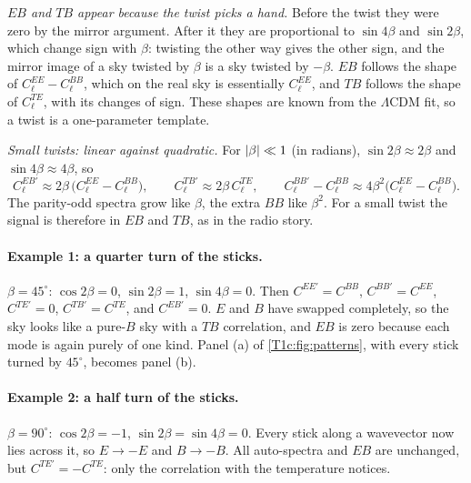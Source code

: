 \emph{$EB$ and $TB$ appear because the twist picks a hand.} Before the twist they were zero by the mirror argument. After it they are proportional to $\sin4\beta$ and $\sin2\beta$, which change sign with $\beta$: twisting the other way gives the other sign, and the mirror image of a sky twisted by $\beta$ is a sky twisted by $-\beta$. $EB$ follows the shape of $C^{EE}_\ell-C^{BB}_\ell$, which on the real sky is essentially $C^{EE}_\ell$, and $TB$ follows the shape of $C^{TE}_\ell$, with its changes of sign. These shapes are known from the $\Lambda$CDM fit, so a twist is a one-parameter template.

\emph{Small twists: linear against quadratic.} For $\left\lvert \beta\right\rvert\ll1$ (in radians), $\sin2\beta\approx2\beta$ and $\sin4\beta\approx4\beta$, so
\begin{equation}
C^{EB\prime}_\ell\approx2\beta\,\bigl(C^{EE}_\ell-C^{BB}_\ell\bigr),\qquad
C^{TB\prime}_\ell\approx2\beta\,C^{TE}_\ell,\qquad
C^{BB\prime}_\ell-C^{BB}_\ell\approx4\beta^2\bigl(C^{EE}_\ell-C^{BB}_\ell\bigr).
\label{T1c:eq:rot-small}
\end{equation}
The parity-odd spectra grow like $\beta$, the extra $BB$ like $\beta^2$. For a small twist the signal is therefore in $EB$ and $TB$, as in the radio story.

\paragraph{Example 1: a quarter turn of the sticks.} $\beta=45^\circ$: $\cos2\beta=0$, $\sin2\beta=1$, $\sin4\beta=0$. Then $C^{EE\prime}=C^{BB}$, $C^{BB\prime}=C^{EE}$, $C^{TE\prime}=0$, $C^{TB\prime}=C^{TE}$, and $C^{EB\prime}=0$. $E$ and $B$ have swapped completely, so the sky looks like a pure-$B$ sky with a $TB$ correlation, and $EB$ is zero because each mode is again purely of one kind. Panel (a) of \cref{T1c:fig:patterns}, with every stick turned by $45^\circ$, becomes panel (b).

\paragraph{Example 2: a half turn of the sticks.} $\beta=90^\circ$: $\cos2\beta=-1$, $\sin2\beta=\sin4\beta=0$. Every stick along a wavevector now lies across it, so $E\to-E$ and $B\to-B$. All auto-spectra and $EB$ are unchanged, but $C^{TE\prime}=-C^{TE}$: only the correlation with the temperature notices.

